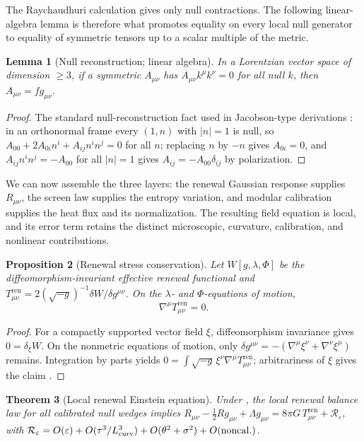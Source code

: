 \documentclass[11pt]{article}
\newtheorem{theorem}{Theorem}[section]
\newtheorem{proposition}[theorem]{Proposition}
\newtheorem{lemma}[theorem]{Lemma}
\theoremstyle{definition}
\theoremstyle{remark}
\newcommand{\eps}{\varepsilon}
\newcommand{\Tren}{T^{\mathrm{ren}}}
\newcommand{\ren}{\mathrm{ren}}
\begin{document}
The Raychaudhuri calculation gives only null contractions.  The following
linear-algebra lemma is therefore what promotes equality on every local null
generator to equality of symmetric tensors up to a scalar multiple of the
metric.

\begin{lemma}[Null reconstruction; linear algebra]
\label{lem:null-reconstruction}
In a Lorentzian vector space of dimension $\ge3$, if a symmetric $A_{\mu\nu}$ has
$A_{\mu\nu}k^\mu k^\nu=0$ for all null $k$, then $A_{\mu\nu}=fg_{\mu\nu}$.
\end{lemma}

\begin{proof}
The standard null-reconstruction fact used in Jacobson-type derivations
\cite{Jacobson}: in an orthonormal frame every $(1,n)$ with $|n|=1$ is null, so
$A_{00}+2A_{0i}n^i+A_{ij}n^in^j=0$ for all $n$; replacing $n$ by $-n$ gives
$A_{0i}=0$, and $A_{ij}n^in^j=-A_{00}$ for all $|n|=1$ gives
$A_{ij}=-A_{00}\delta_{ij}$ by polarization.
\end{proof}

We can now assemble the three layers: the renewal Gaussian response supplies
$R_{\mu\nu}$, the screen law supplies the entropy variation, and modular
calibration supplies the heat flux and its normalization.  The resulting field
equation is local, and its error term retains the distinct microscopic,
curvature, calibration, and nonlinear contributions.


\begin{proposition}[Renewal stress conservation]
\label{prop:renewal-noether}
Let $W[g,\lambda,\Phi]$ be the diffeomorphism-invariant effective renewal
functional and
$T^{\ren}_{\mu\nu}=2(\sqrt{-g})^{-1}\delta W/\delta g^{\mu\nu}$.
On the $\lambda$- and $\Phi$-equations of motion,
\[
 \nabla^\mu T^{\ren}_{\mu\nu}=0.
\]
\end{proposition}

\begin{proof}
For a compactly supported vector field $\xi$, diffeomorphism invariance gives
$0=\delta_\xi W$.  On the nonmetric equations of motion, only
$\delta g^{\mu\nu}=-(\nabla^\mu\xi^\nu+\nabla^\nu\xi^\mu)$ remains.  Integration
by parts yields
$0=\int\sqrt{-g}\,\xi^\nu\nabla^\mu T^{\ren}_{\mu\nu}$; arbitrariness of $\xi$
gives the claim \cite{Noether,WaldBook}.
\end{proof}

\begin{theorem}[Local renewal Einstein equation]
\label{thm:einstein}
Under , the local renewal balance law for all
calibrated null wedges implies
$R_{\mu\nu}-\tfrac12R g_{\mu\nu}+\Lambda g_{\mu\nu}=8\pi G\,\Tren_{\mu\nu}+\mathcal R_\eps$,
with $\mathcal R_\eps=O(\eps)+O(\tau^3/L_{\rm curv}^3)+O(\theta^2+\sigma^2)+O(\mathrm{noncal.})$.
\end{theorem}
\end{document}
